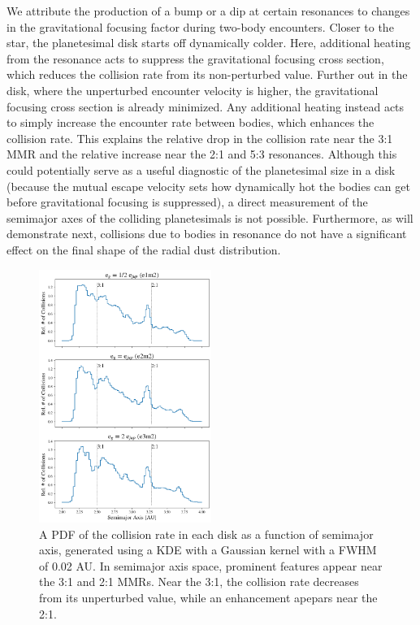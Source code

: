 \documentclass[twocolumn]{aastex63}
\begin{document}
We attribute the production of a bump or a dip at certain resonances to changes in the gravitational focusing factor during two-body encounters. 
Closer to the star, the planetesimal disk starts off dynamically colder. Here, additional heating from the resonance acts to suppress the gravitational 
focusing cross section, which reduces the collision rate from its non-perturbed value. Further out in the disk, where the unperturbed encounter velocity is higher, the gravitational focusing cross section is already minimized. Any additional heating instead acts to simply increase the encounter rate between bodies, which enhances the collision rate. This explains the relative drop in the collision rate near the 3:1 MMR and the relative increase near the 2:1 and 5:3 resonances. Although this could potentially serve as a useful diagnostic of the planetesimal size in a disk (because the mutual escape velocity sets how dynamically hot the bodies can get before gravitational focusing is suppressed), a direct measurement of the semimajor axes of the colliding planetesimals is not possible. Furthermore, as will demonstrate next, collisions due to bodies in resonance do not have a significant effect on the final shape of the radial dust distribution.

\begin{figure}
\begin{center}
    \includegraphics[width=0.5\textwidth]{figures/coll_hist_a.png}
    \caption{A PDF of the collision rate in each disk as a function of semimajor axis, generated using a KDE with a Gaussian kernel with a FWHM of 0.02 AU. In semimajor axis space, prominent features appear near the 3:1 and 2:1 MMRs. Near the 3:1, the collision rate decreases from its unperturbed value, while an enhancement apepars near the 2:1.\label{fig:coll_hist_a}}
\end{center}
\end{figure}
\end{document}
